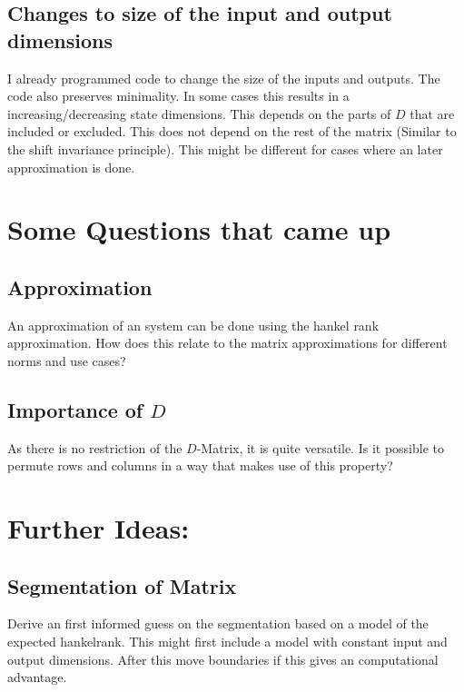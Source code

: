 \documentclass[lang=ngerman,inputenc=utf8,fontsize=10pt]{ldvarticle}
\begin{document}
\subsection*{Changes to size of the input and output dimensions}
I already programmed code to change the size of the inputs and outputs. The code also preserves minimality.
In some cases this results in a increasing/decreasing state dimensions. This depends on the parts of $D$ that are included or excluded. 
This does not depend on the rest of the matrix (Similar to the shift invariance principle).
This might be different for cases where an later approximation is done.

\section{Some Questions that came up}

\subsection*{Approximation}
An approximation of an system can be done using the hankel rank approximation. 
How does this relate to the matrix approximations for different norms and use cases?

\subsection*{Importance of $D$}
As there is no restriction of the $D$-Matrix, it is quite versatile.
Is it possible to permute rows and columns in a way that makes use of this property?

\section{Further Ideas:}

\subsection*{Segmentation of Matrix}
Derive an first informed guess on the segmentation based on a model of the expected hankelrank. This might first include a model with constant input and output dimensions. 
After this move boundaries if this gives an computational advantage.
\end{document}
